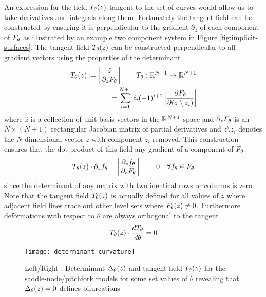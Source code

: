 An expression for the field $T_{\theta}(z)$ tangent to the set of curves would allow us to take derivatives and integrals along them. Fortunately the tangent field can be constructed by ensuring it is perpendicular to the gradient $\partial_z$ of each component of $F_{\theta}$ as illustrated by an example two component system in Figure \ref{fig:implicit-surfaces}. The tangent field $T_{\theta}(z)$ can be constructed perpendicular to all gradient vectors using the properties of the determinant \cite{Goldman2005CurvatureSurfaces}
\begin{align}
    T_{\theta}(z):=
    \label{eq:tangent-field}
    \left|\begin{matrix}
        \hat{z} \\
        \,\partial_{z}F_{\theta}\,
    \end{matrix}\right|
    \qquad T_{\theta} : \mathbb{R}^{N+1}\rightarrow\mathbb{R}^{N+1}\\
    =\sum_{i=1}^{N+1}\hat{z}_{i}(-1)^{i+1} \left|\frac{\partial F_{\theta}}{\partial(z\setminus z_{i}) }\right|
\end{align}
where $\hat{z}$ is a collection of unit basis vectors in the $\mathbb{R}^{N+1}$ space and $\partial_{z}F_{\theta}$ is an $N\times(N+1)$ rectangular Jacobian matrix of partial derivatives and $z\setminus z_{i}$ denotes the $N$ dimensional vector $z$ with component $z_{i}$ removed. This construction ensures that the dot product of this field any gradient of a component of $F_{\theta}$
\begin{align}
    T_{\theta}(z)\cdot\partial_z f_{\theta} =
    \left|\begin{matrix}
        \partial_z f_{\theta} \\
        \,\partial_{z}F_{\theta}\,
    \end{matrix}\right|
    \quad =0 \quad\forall f_{\theta}\in F_{\theta}
\end{align}
since the determinant of any matrix with two identical rows or columns is zero. Note that the tangent field $T_{\theta}(z)$ is actually defined for all values of $z$ where adjacent field lines trace out other level sets where $F_{\theta}(z)\neq0$. Furthermore deformations with respect to $\theta$ are always orthogonal to the tangent 
\begin{align}
    T_{\theta}(z)\cdot\frac{dT_{\theta}}{d\theta}=0
\end{align}

\begin{figure}[H]
\centering{}
\captionsetup{justification=centering}
\texttt{[image: determinant-curvature]}
\caption{Left/Right : Determinant $\Delta_{\theta}(z)$ and tangent field $T_{\theta}(z)$ for the saddle-node/pitchfork models for some set values of $\theta$ revealing that $\Delta_{\theta}(z)=0$ defines bifurcations}
\label{fig:determinant-curvature}
\end{figure}


